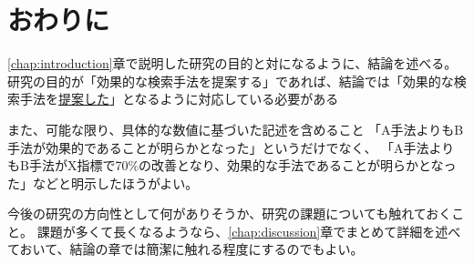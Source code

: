 \chapter{おわりに}
\label{chap:conclusion}

\ref{chap:introduction}章で説明した研究の目的と対になるように、結論を述べる。
研究の目的が「効果的な検索手法を提案する」であれば、結論では「効果的な検索手法を\underline{提案した}」となるように対応している必要がある

また、可能な限り、具体的な数値に基づいた記述を含めること
「A手法よりもB手法が効果的であることが明らかとなった」というだけでなく、
「A手法よりもB手法がX指標で70\%の改善となり、効果的な手法であることが明らかとなった」などと明示したほうがよい。

今後の研究の方向性として何がありそうか、研究の課題についても触れておくこと。
課題が多くて長くなるようなら、\ref{chap:discussion}章でまとめて詳細を述べておいて、結論の章では簡潔に触れる程度にするのでもよい。
